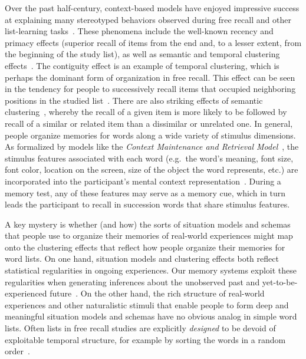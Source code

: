 \documentclass[11pt]{article}
\begin{document}
Over the past half-century, context-based models have enjoyed impressive
success at explaining many stereotyped behaviors observed during free recall
and other list-learning tasks~\citep{Este55a, RaaiShif80, GlenEtal83,
HowaKaha02a, SiroEtal05, KimbEtal07, PolyKaha08, SedeEtal08, PolyEtal09,
ShanHowa12}. These phenomena include the well-known recency and primacy effects
(superior recall of items from the end and, to a lesser extent, from the
beginning of the study list), as well as semantic and temporal clustering
effects~\citep{KahaEtal08b}. The contiguity effect is an example of temporal
clustering, which is perhaps the dominant form of organization in free recall.
This effect can be seen in the tendency for people to successively recall items
that occupied neighboring positions in the studied list~\citep{Kaha96}. There
are also striking effects of semantic clustering~\citep{RomnEtal93, Bous53,
BousEtal54, JenkRuss52, MannKaha12}, whereby the recall of a given item is more
likely to be followed by recall of a similar or related item than a dissimilar
or unrelated one. In general, people organize memories for words along a wide
variety of stimulus dimensions. As formalized by models like the
\textit{Context Maintenance and Retrieval Model}~\citep{PolyEtal09}, the
stimulus features associated with each word (e.g.\ the word's meaning, font
size, font color, location on the screen, size of the object the word
represents, etc.) are incorporated into the participant's mental context
representation~\citep{SmitVela01, MannEtal15, Mann20, MannEtal11, MannEtal12}.
During a memory test, any of these features may serve as a memory cue, which in
turn leads the participant to recall in succession words that share stimulus
features.


A key mystery is whether (and how) the sorts of situation models and schemas that people
use to organize their memories of real-world experiences might map onto the
clustering effects that reflect how people organize their memories for word
lists. On one hand, situation models and clustering effects both reflect
statistical regularities in ongoing experiences. Our memory systems exploit
these regularities when generating inferences about the unobserved past and
yet-to-be-experienced future~\citep{XuEtal23, SchaTurk15, RangRitc12,
BoweEtal79, MomeEtal17}. On the other hand, the rich structure of real-world
experiences and other naturalistic stimuli that enable people to form deep and meaningful
situation models and schemas have no obvious analog in simple word lists.  Often lists
in free recall studies are explicitly \textit{designed} to be devoid of exploitable
temporal structure, for example by sorting the words in a random order~\citep{Kaha12}.
\end{document}
